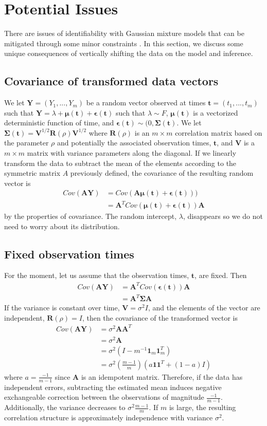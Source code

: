 \documentclass[12pt]{article}
\newcommand{\B}[0]{\mathbf}
\newcommand{\bs}[0]{\boldsymbol}
\begin{document}
\section{Potential Issues}
There are issues of identifiability with Gaussian mixture models that can be mitigated through some minor constraints \cite{mclachlan2000}. In this section, we discuss some unique consequences of vertically shifting the data on the model and inference.

\subsection{Covariance of transformed data vectors}
We let $\B Y=(Y_{1},...,Y_{m})$ be a random vector observed at times $\B t=(t_{1},...,t_{m})$ such that
$\B Y = \lambda + \bs\mu(\B t) + \bs\epsilon(\B t)$
such that $\lambda\sim F$, $\bs\mu(\B t)$ is a vectorized deterministic function of time, and $\bs\epsilon(\B t)\sim(0,\bs\Sigma(\B t)$. We let $\B\Sigma(\B t) =\B V^{1/2}\B R(\rho)\B V^{1/2}$ where $\B R(\rho)$ is an $m\times m$ correlation matrix based on the parameter $\rho$ and potentially the associated observation times, $\B t$, and $\B V$ is a $m\times m$ matrix with variance parameters along the diagonal. If we linearly transform the data to subtract the mean of the elements according to the symmetric matrix $A$ previously defined, the covariance of the resulting random vector is
\begin{align*}
Cov(\B A\B Y) &= Cov(\B A\bs\mu(\B t)+\bs\epsilon(\B t)))\\
&= \B A^{T}Cov(\bs\mu(\B t)+\bs\epsilon(\B t))\B A
\end{align*}
by the properties of covariance. The random intercept, $\lambda$, disappears so we do not need to worry about its distribution. 
\subsection{Fixed observation times}
For the moment, let us assume that the observation times, $\B t$, are fixed. Then
\begin{align*}
Cov(\B A\B Y)&= \B A^{T}Cov(\bs\epsilon(\B t))\B A\\
&= \B A^{T}\B\Sigma \B A
\end{align*}
If the variance is constant over time, $\B V=\sigma^{2}I$, and the elements of the vector are independent, $\B R(\rho)=I$, then the covariance of the transformed vector is
\begin{align*} 
Cov(\B A\B Y) &= \sigma^{2}\B A\B A^{T} \\
&=\sigma^{2}\B A\\
&= \sigma^{2}(I - m^{-1}\B1_{m}\B1_{m}^{T})\\
&=\sigma^{2}\left(\frac{m-1}{m}\right)(a\B 1\B 1^{T}+ (1-a)I)
\end{align*}
 where $a=\frac{-1}{m-1}$ since $\B A$ is an idempotent matrix. Therefore, if the data has independent errors, subtracting the estimated mean induces negative exchangeable correction between the observations of magnitude $\frac{-1}{m-1}$. Additionally, the variance decreases to $\sigma^{2}\frac{m-1}{m}$. If $m$ is large, the resulting correlation structure is approximately independence with variance $\sigma^{2}$.
 
\end{document}
